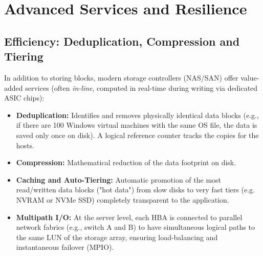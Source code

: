 \section{Advanced Services and Resilience}

\subsection{Efficiency: Deduplication, Compression and Tiering}
In addition to storing blocks, modern storage controllers (NAS/SAN) offer value-added services (often \textit{in-line}, computed in real-time during writing via dedicated ASIC chips):
\begin{itemize}
    \item \textbf{Deduplication:} Identifies and removes physically identical data blocks (e.g., if there are 100 Windows virtual machines with the same OS file, the data is saved only once on disk). A logical reference counter tracks the copies for the hosts.
    \item \textbf{Compression:} Mathematical reduction of the data footprint on disk.
    \item \textbf{Caching and Auto-Tiering:} Automatic promotion of the most read/written data blocks ("hot data") from slow disks to very fast tiers (e.g. NVRAM or NVMe SSD) completely transparent to the application.
    \item \textbf{Multipath I/O:} At the server level, each HBA is connected to parallel network fabrics (e.g., switch A and B) to have simultaneous logical paths to the same LUN of the storage array, ensuring load-balancing and instantaneous failover (MPIO).
\end{itemize}

